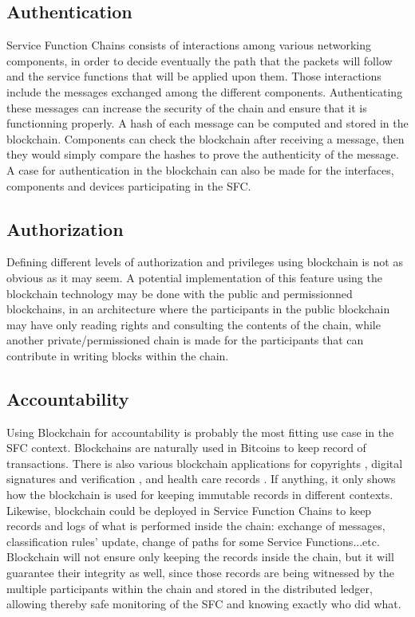 \subsection{Authentication}
Service Function Chains consists of interactions among various networking components, in order to decide eventually the path that the packets will follow and the service functions that will be applied upon them. Those interactions include the messages exchanged among the different components. Authenticating these messages can increase the security of the chain and ensure that it is functionning properly. A hash of each message can be computed and stored in the blockchain. Components can check the blockchain after receiving a message, then they would simply compare the hashes to prove the authenticity of the message. A case for authentication in the blockchain can also be made for the interfaces, components and devices participating in the SFC.
\subsection{Authorization}
Defining different levels of authorization and privileges using blockchain is not as obvious as it may seem. A potential implementation of this feature using the blockchain technology may be done with the public and permissionned blockchains, in an architecture where the participants in the public blockchain may have only reading rights and consulting the contents of the chain, while another private/permissioned chain is made for the participants that can contribute in writing blocks within the chain.
\subsection{Accountability}
Using Blockchain for accountability is probably the most fitting use case in the SFC context. Blockchains are naturally used in Bitcoins to keep record of transactions. There is also various blockchain applications for copyrights \cite{copyrights}, digital signatures and verification \cite{blocksign}, and health care records \cite{health}. If anything, it only shows how the blockchain is used for keeping immutable records in different contexts. Likewise, blockchain could be deployed in Service Function Chains to keep records and logs of what is performed inside the chain: exchange of messages, classification rules' update, change of paths for some Service Functions...etc. Blockchain will not ensure only keeping the records inside the chain, but it will guarantee their integrity as well, since those records are being witnessed by the multiple participants within the chain and stored in the distributed ledger, allowing thereby safe monitoring of the SFC and knowing exactly who did what.

